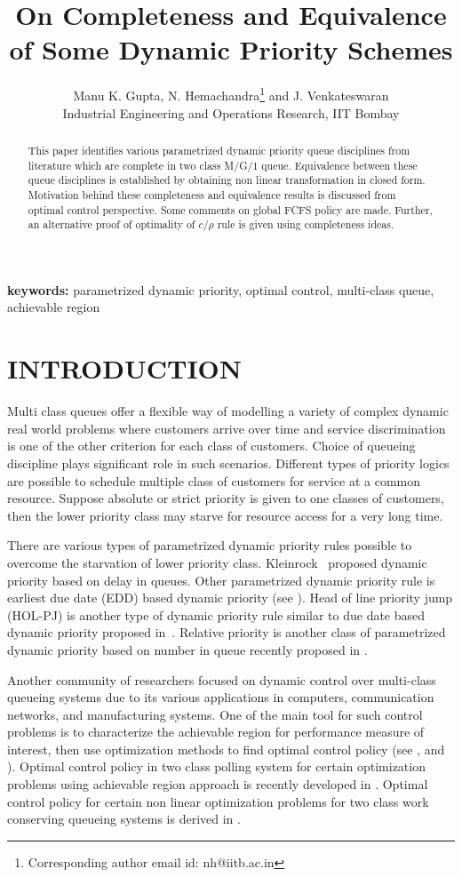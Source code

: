 \documentclass[a4paper,12pt]{article}
\title{On Completeness and Equivalence of Some Dynamic Priority Schemes}
\author{\normalsize{Manu K. Gupta, N. Hemachandra\footnote{Corresponding author email id:  nh@iitb.ac.in} and J. Venkateswaran}\\ {\normalsize Industrial Engineering and Operations Research, IIT Bombay}}
\begin{document}
\maketitle 
\begin{abstract}
This paper identifies various parametrized dynamic priority queue disciplines from literature which are complete in two class M/G/1 queue. Equivalence between these queue disciplines is established by obtaining non linear transformation in closed form. Motivation behind these completeness and equivalence results is discussed from optimal control perspective. Some comments on global FCFS policy are made. Further, an alternative proof of optimality of $c/\rho$ rule is given using completeness ideas. %
\end{abstract}
\textbf{keywords:}
parametrized dynamic priority, optimal control, multi-class queue, achievable region 

\section{INTRODUCTION}
Multi class queues offer a flexible way of modelling a variety of complex dynamic real world problems where customers arrive over time and service discrimination is one of the other criterion for each class of customers. Choice of queueing discipline plays significant role in such scenarios. Different types of priority logics are possible to schedule
multiple class of customers for service at a common resource.
Suppose absolute or strict priority is given to one classes of
customers, then the lower priority class may starve for resource
access for a very long time.

There are various types of parametrized dynamic priority rules possible to overcome the starvation of lower priority class. Kleinrock~\cite{Kleinrock1964} proposed dynamic priority based on delay in queues. Other parametrized dynamic priority rule is earliest due date (EDD) based dynamic priority (see \cite{EDDpriority}). Head of line priority jump (HOL-PJ) is another type of dynamic priority rule similar to due date based dynamic priority proposed in~\cite{holpj}. Relative priority is another class of parametrized dynamic priority based on number in queue recently proposed in \cite{haviv2}.

Another community of researchers focused on dynamic control over multi-class queueing systems due to its various applications in computers, communication networks, and manufacturing systems. One of the main tool for such control problems is to characterize the achievable region for performance measure of interest, then use optimization methods to find optimal control policy (see \cite{bertsimas1995achievable}, \cite{bertsimas1996conservation} and \cite{li2012delay}). Optimal control policy in two class polling system for certain optimization problems using achievable region approach is recently developed  in \cite{2classpolling}. Optimal control policy for certain non linear optimization problems for two class work conserving queueing systems is derived in \cite{hassin2009use}. 
\end{document}
